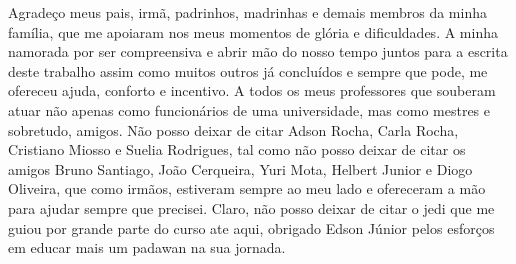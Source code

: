 \begin{agradecimentos}


Agradeço meus pais, irmã, padrinhos, madrinhas e demais membros da minha família, que me apoiaram  nos meus momentos de glória e dificuldades. A minha namorada por ser compreensiva e abrir mão do nosso tempo juntos para a escrita deste trabalho assim como muitos outros já concluídos e sempre que pode, me ofereceu ajuda, conforto e incentivo. A todos os meus professores que souberam atuar não apenas como funcionários de uma universidade, mas como mestres e sobretudo, amigos. Não posso deixar de citar Adson Rocha, Carla Rocha, Cristiano Miosso e Suelia Rodrigues, tal como não posso deixar de citar os amigos Bruno Santiago, João Cerqueira, Yuri Mota, Helbert Junior e Diogo Oliveira, que como irmãos, estiveram sempre ao meu lado e ofereceram a mão para ajudar sempre que precisei. Claro, não posso deixar de citar o jedi que me guiou por grande parte do curso ate aqui, obrigado Edson Júnior pelos esforços em educar mais um padawan na sua jornada.

\end{agradecimentos}
